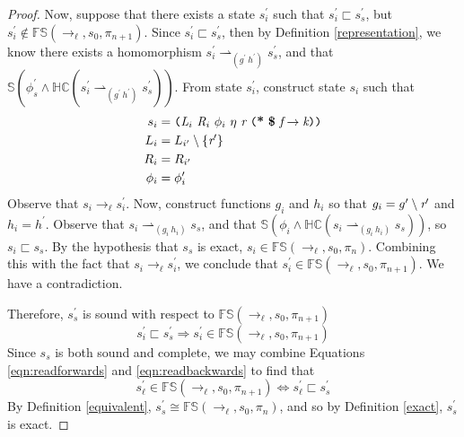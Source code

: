 \begin{proof}

Now, suppose that there exists a state $s_i^\prime$ such that $s_i^\prime \sqsubset s_s^\prime$, but $s_i^\prime \notin \mathbb{FS}(\rightarrow_{\ell},s_0,\pi_{n+1})$. Since $s_i^\prime \sqsubset s_s^\prime$, then by Definition \ref{representation}, we know there exists a homomorphism $s_i^\prime \rightharpoonup_{(g^\prime\ h^\prime)} s_s^\prime$, and that $\mathbb{S}( \phi_s^\prime \wedge \mathbb{HC}(s_i^\prime \rightharpoonup_{(g^\prime\ h^\prime)} s_s^\prime) )$. From state $s_i^\prime$, construct state $s_i$ such that 
\begin{align*}
s_i &= \lp \cfgnt{L}_{i}\ \cfgnt{R}_{i}\ \phi_i\ \eta\ \cfgnt{r}\ \lp \cfgt{*}\ \cfgt{\$}\ \cfgnt{f} \rightarrow \cfgnt{k}\rp \rp\\
L_i &= L_{i^\prime} \setminus \{\cfgnt{r}^\prime \}\\
R_i &= R_{i^\prime}\\
\phi_i &= \phi_i^\prime
\end{align*}
Observe that $s_i \rightarrow_\ell s_i^\prime$. Now, construct functions $g_i$ and $h_i$ so that $g_i = g^\prime \setminus \emph{r}^\prime$ and $h_i = h^\prime$. Observe that $s_i \rightharpoonup_{(g_i\ h_i)} s_s$, and that $\mathbb{S}( \phi_i \wedge \mathbb{HC}(s_i \rightharpoonup_{(g_i\ h_i)} s_s) )$, so $s_i \sqsubset s_s$. By the hypothesis that $s_s$ is exact, $s_i \in\mathbb{FS}(\rightarrow_{\ell},s_0,\pi_n)$. Combining this with the fact that $s_i \rightarrow_\ell s_i^\prime$, we conclude that $s_i^\prime \in \mathbb{FS}(\rightarrow_{\ell},s_0,\pi_{n+1})$. We have a contradiction.

 Therefore, $s_s^\prime$ is sound with respect to $\mathbb{FS}(\rightarrow_{\ell},s_0,\pi_{n+1})$
 \begin{equation}
 \label{eqn:readbackwards}
 s_i^\prime \sqsubset s_s^\prime \Rightarrow s_i^\prime \in \mathbb{FS}(\rightarrow_{\ell},s_0,\pi_{n+1})
 \end{equation}
Since $s_s$ is both sound and complete, we may combine Equations \ref{eqn:readforwards} and \ref{eqn:readbackwards} to find that 
$$s_\ell^\prime \in \mathbb{FS}(\rightarrow_{\ell},s_0,\pi_{n+1}) \Leftrightarrow s_\ell^\prime \sqsubset s_s^\prime$$
By Definition \ref{equivalent}, $s_s^\prime \cong \mathbb{FS}(\rightarrow_{\ell},s_0,\pi_n)$, and so by Definition \ref{exact}, $s_s^\prime$ is exact.


\end{proof}
